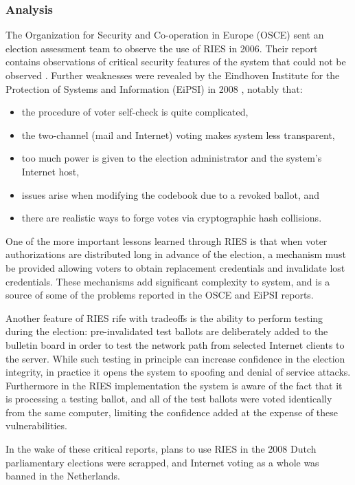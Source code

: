 \subsubsection{Analysis}

The Organization for Security and Co-operation in Europe (OSCE) sent
an election assessment team to observe the use of RIES in 2006. Their
report contains observations of critical security features of the
system that could not be observed \cite{osce2007}. Further
weaknesses were revealed by the Eindhoven Institute for the Protection
of Systems and Information (EiPSI) in 2008 \cite{hubbers2008},
notably that:

\begin{itemize}
  \item the procedure of voter self-check is quite complicated,
  \item the two-channel (mail and Internet) voting makes system less
    transparent,
  \item too much power is given to the election administrator and the
    system's Internet host,
  \item issues arise when modifying the codebook due to a revoked
    ballot, and
  \item there are realistic ways to forge votes via cryptographic hash
    collisions.
\end{itemize}

One of the more important lessons learned through RIES is that when
voter authorizations are distributed long in advance of the election,
a mechanism must be provided allowing voters to obtain replacement
credentials and invalidate lost credentials. These mechanisms add
significant complexity to system, and is a source of some of the
problems reported in the OSCE and EiPSI reports.

Another feature of RIES rife with tradeoffs is the ability to perform
testing during the election: pre-invalidated test ballots are
deliberately added to the bulletin board in order to test the network
path from selected Internet clients to the server. While such testing
in principle can increase confidence in the election integrity, in
practice it opens the system to spoofing and denial of service
attacks. Furthermore in the RIES implementation the system is aware of
the fact that it is processing a testing ballot, and all of the test
ballots were voted identically from the same computer, limiting the
confidence added at the expense of these vulnerabilities.

In the wake of these critical reports, plans to use RIES in the 2008
Dutch parliamentary elections were scrapped, and Internet voting as a
whole was banned in the Netherlands.

